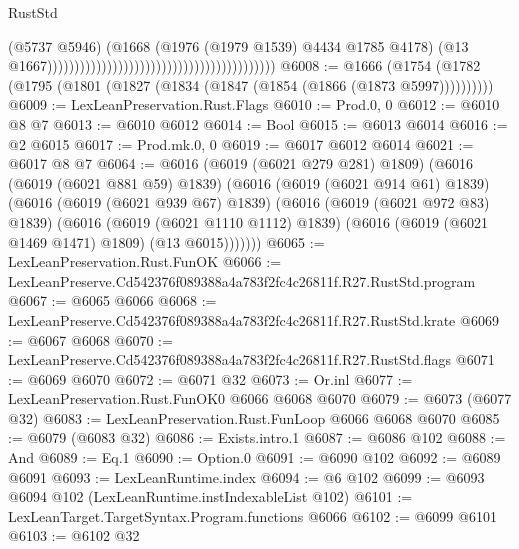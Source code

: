 \begin{lexlean}{RustStd}
\begin{coremodule}
                                                                                    (@5737 @5946)
                                                                                    (@1668
                                                                                      (@1976
                                                                                        (@1979
                                                                                          @1539)
                                                                                        @4434
                                                                                        @1785
                                                                                        @4178)
                                                                                      (@13
                                                                                        @1667))))))))))))))))))))))))))))))))))))))))))
@6008 := @1666 (@1754 (@1782 (@1795 (@1801 (@1827 (@1834 (@1847 (@1854 (@1866 (@1873 @5997))))))))))
@6009 := LexLeanPreservation.Rust.Flags
@6010 := Prod.{0, 0}
@6012 := @6010 @8 @7
@6013 := @6010 @6012
@6014 := Bool
@6015 := @6013 @6014
@6016 := @2 @6015
@6017 := Prod.mk.{0, 0}
@6019 := @6017 @6012 @6014
@6021 := @6017 @8 @7
@6064 := @6016
    (@6019 (@6021 @279 @281) @1809)
    (@6016
      (@6019 (@6021 @881 @59) @1839)
      (@6016
        (@6019 (@6021 @914 @61) @1839)
        (@6016
          (@6019 (@6021 @939 @67) @1839)
          (@6016
            (@6019 (@6021 @972 @83) @1839)
            (@6016
              (@6019 (@6021 @1110 @1112) @1839)
              (@6016 (@6019 (@6021 @1469 @1471) @1809) (@13 @6015)))))))
@6065 := LexLeanPreservation.Rust.FunOK
@6066 := LexLeanPreserve.Cd542376f089388a4a783f2fc4c26811f.R27.RustStd.program
@6067 := @6065 @6066
@6068 := LexLeanPreserve.Cd542376f089388a4a783f2fc4c26811f.R27.RustStd.krate
@6069 := @6067 @6068
@6070 := LexLeanPreserve.Cd542376f089388a4a783f2fc4c26811f.R27.RustStd.flags
@6071 := @6069 @6070
@6072 := @6071 @32
@6073 := Or.inl
@6077 := LexLeanPreservation.Rust.FunOK0 @6066 @6068 @6070
@6079 := @6073 (@6077 @32)
@6083 := LexLeanPreservation.Rust.FunLoop @6066 @6068 @6070
@6085 := @6079 (@6083 @32)
@6086 := Exists.intro.{1}
@6087 := @6086 @102
@6088 := And
@6089 := Eq.{1}
@6090 := Option.{0}
@6091 := @6090 @102
@6092 := @6089 @6091
@6093 := LexLeanRuntime.index
@6094 := @6 @102
@6099 := @6093 @6094 @102 (LexLeanRuntime.instIndexableList @102)
@6101 := LexLeanTarget.TargetSyntax.Program.functions @6066
@6102 := @6099 @6101
@6103 := @6102 @32

\end{coremodule}
\end{lexlean}
